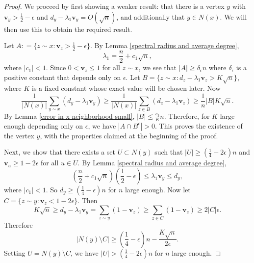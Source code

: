 \begin{proof}
We proceed by first showing a weaker result: that there is a vertex $y$ with
$\mathbf{v}_y> \frac{1}{2} - \epsilon$ and $d_y - \lambda_1 \mathbf{v}_y = O(\sqrt{n})$, and 
additionally that $y \in N(x)$.  We will then use this to obtain
the required result.


Let $A: = \{z\sim x: \mathbf{v}_z> \frac{1}{2} - \epsilon\}$. By Lemma \ref{spectral radius and average degree},
\[
\lambda_1 = \frac{n}{2} + c_1\sqrt{n},
\]
where $|c_1| <1$. Since $0< \mathbf{v}_z\leq 1$ for all $z\sim x$, we see that $|A| \geq \delta_\epsilon n$ where $\delta_\epsilon$ is a positive constant that depends only on $\epsilon$. Let $B = \{z\sim x: d_z - \lambda_1 \mathbf{v}_z >  K\sqrt{n}\}$, where $K$ is a fixed constant whose exact value will be chosen later. Now
\[
\frac{1}{|N(x)|} \sum_{y\sim x} \left( d_y -\lambda_1 \mathbf{v}_y \right) \geq \frac{1}{|N(x)|} \sum_{z\in B} \left( d_z - \lambda_1 \mathbf{v}_z \right) \geq \frac{1}{n} |B| K\sqrt{n}.
\]
By Lemma \ref{error in x neighborhood small}, $|B| \leq \frac{c_3}{K} n$. Therefore, for $K$ large enough depending only on $\epsilon$, we have $\left|A\cap B^c\right| > 0$.  This proves the existence of the vertex $y$,
with the properties claimed at the beginning of the proof.


Next, we show that there exists a set $U\subset N(y)$ such that 
$|U| \geq \left(\frac{1}{4} - 2\epsilon \right)n$ and 
$\mathbf{v}_u \geq 1-2\epsilon$ for all $u\in U$.  By Lemma \ref{spectral radius and average degree},
\[
\left(\frac{n}{2} + c_1\sqrt{n}\right)\left(\frac{1}{2} - \epsilon\right) \leq \lambda_1 \mathbf{v}_y \leq d_y,
\]
where $|c_1| < 1$. So $d_y \geq \left(\frac{1}{4} - \epsilon \right) n$ for $n$ large enough. Now let $C = \{z\sim y: \mathbf{v}_z < 1-2\epsilon \}$. Then
\[
K \sqrt{n} \geq d_y - \lambda_1 \mathbf{v}_y = \sum_{z\sim y} \left( 1 - \mathbf{v}_z \right) \geq \sum_{z\in C} \left( 1-\mathbf{v}_z \right) \geq 2|C| \epsilon.
\]
Therefore
\[
|N(y) \setminus C| \geq \left(\frac{1}{4} - \epsilon\right)n  - \frac{K \sqrt{n}}{2\epsilon}.
\]
Setting $U = N(y) \setminus C$, we have $|U| > \left(\frac{1}{4} - 2\epsilon\right)n$ for $n$ large enough. 



\end{proof}
